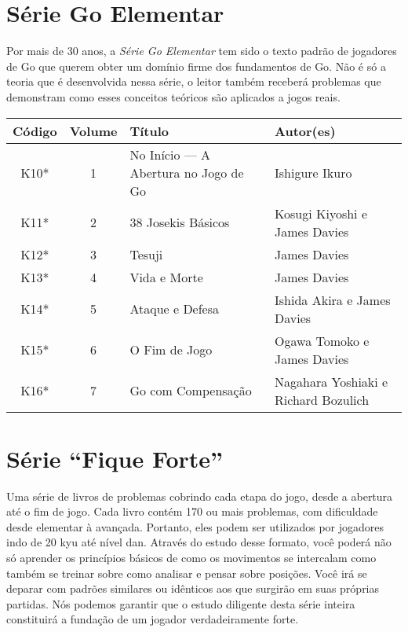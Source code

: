 \section{Série Go Elementar}

Por mais de 30 anos, a \emph{Série Go Elementar} tem sido o texto padrão de jogadores de Go que querem obter um domínio firme dos fundamentos de Go. Não é só a teoria que é desenvolvida nessa série, o leitor também receberá problemas que demonstram como esses conceitos teóricos são aplicados a jogos reais.

\begin{longtable}{c|c|p{35mm}|p{35mm}} 
    \hline
    \textbf{Código} & \textbf{Volume} & \textbf{Título} &\textbf{Autor(es)} \\
    \hline \hline
    K10* & 1 & No Início --- A Abertura no Jogo de Go & Ishigure Ikuro \\
    \hline
    K11* & 2 & 38 Josekis Básicos & Kosugi Kiyoshi e James Davies \\
    \hline
    K12* & 3 & Tesuji & James Davies \\
    \hline
    K13* & 4 & Vida e Morte & James Davies \\
    \hline
    K14* & 5 & Ataque e Defesa & Ishida Akira e James Davies \\
    \hline
    K15* & 6 & O Fim de Jogo & Ogawa Tomoko e James Davies \\
    \hline
    K16* & 7 & Go com Compensação & Nagahara Yoshiaki e Richard Bozulich \\
    \hline
\end{longtable}

\section{Série ``Fique Forte''}

Uma série de livros de problemas cobrindo cada etapa do jogo, desde a abertura até o fim de jogo. Cada livro contém 170 ou mais problemas, com dificuldade desde elementar à avançada. Portanto, eles podem ser utilizados por jogadores indo de 20 kyu até nível dan. Através do estudo desse formato, você poderá não só aprender os princípios básicos de como os movimentos se intercalam como também se treinar sobre como analisar e pensar sobre posições. Você irá se deparar com padrões similares ou idênticos aos que surgirão em suas próprias partidas. Nós podemos garantir que o estudo diligente desta série inteira constituirá a fundação de um jogador verdadeiramente forte.

